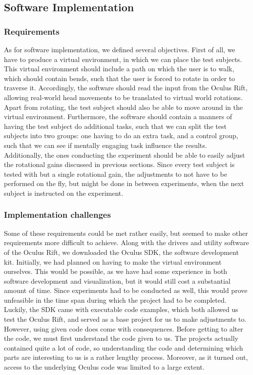 \subsection{Software Implementation}
\subsubsection{Requirements}
As for software implementation, we defined several objectives.
First of all, we have to produce a virtual environment, in which we can place the test subjects.
This virtual environment should include a path on which the user is to walk, which should contain bends, such that the user is forced to rotate in order to traverse it.
Accordingly, the software should read the input from the Oculus Rift, allowing real-world head movements to be translated to virtual world rotations.
Apart from rotating, the test subject should also be able to move around in the virtual environment.
Furthermore, the software should contain a manners of having the test subject do additional tasks, such that we can split the test subjects into two groups: one having to do an extra task, and a control group, such that we can see if mentally engaging task influence the results.\\
Additionally, the ones conducting the experiment should be able to easily adjust the rotational gains discussed in previous sections.
Since every test subject is tested with but a single rotational gain, the adjustments to not have to be performed on the fly, but might be done in between experiments, when the next subject is instructed on the experiment.

\subsubsection{Implementation challenges}
Some of these requirements could be met rather easily, but seemed to make other requirements more difficult to achieve.
Along with the drivers and utility software of the Oculus Rift, we downloaded the Oculus SDK, the software development kit.
Initially, we had planned on having to make the virtual environment ourselves.
This would be possible, as we have had some experience in both software development and visualization, but it would still cost a substantial amount of time.
Since experiments had to be conducted as well, this would prove unfeasible in the time span during which the project had to be completed.
Luckily, the SDK came with executable code examples, which both allowed us test the Oculus Rift, and served as a base project for us to make adjustments to. \\
However, using given code does come with consequences.
Before getting to alter the code, we must first understand the code given to us.
The projects actually contained quite a lot of code, so understanding the code and determining which parts are interesting to us is a rather lengthy process.
Moreover, as it turned out, access to the underlying Oculus code was limited to a large extent. \\

